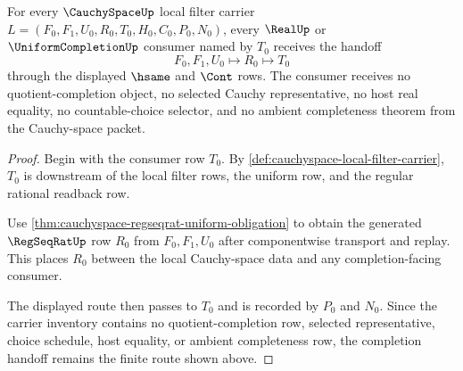 \begin{theorem}
\label{thm:cauchyspace-completion-handoff-obligation}
For every $\CauchySpaceUp$ local filter carrier $L=(F_0,F_1,U_0,R_0,T_0,H_0,C_0,P_0,N_0)$, every $\RealUp$ or $\UniformCompletionUp$ consumer named by $T_0$ receives the handoff
$$
F_0,F_1,U_0 \longmapsto R_0 \longmapsto T_0
$$
through the displayed $\hsame$ and $\Cont$ rows. The consumer receives no quotient-completion object, no selected Cauchy representative, no host real equality, no countable-choice selector, and no ambient completeness theorem from the Cauchy-space packet.
\end{theorem}
\begin{proof}
Begin with the consumer row $T_0$. By \autoref{def:cauchyspace-local-filter-carrier}, $T_0$ is downstream of the local filter rows, the uniform row, and the regular rational readback row.

Use \autoref{thm:cauchyspace-regseqrat-uniform-obligation} to obtain the generated $\RegSeqRatUp$ row $R_0$ from $F_0,F_1,U_0$ after componentwise transport and replay. This places $R_0$ between the local Cauchy-space data and any completion-facing consumer.

The displayed route then passes to $T_0$ and is recorded by $P_0$ and $N_0$. Since the carrier inventory contains no quotient-completion row, selected representative, choice schedule, host equality, or ambient completeness row, the completion handoff remains the finite route shown above.
\end{proof}

